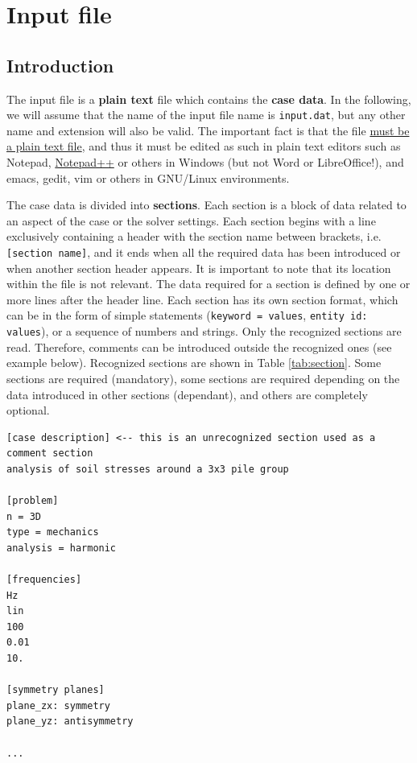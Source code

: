 \documentclass[a4paper,fleqn]{book}
\begin{document}
\chapter{Input file}

\label{ch:input_file}

\section{Introduction}

The input file is a \textbf{plain text} file which contains the \textbf{case data}. In the following, we will assume that the name of the input file name is \texttt{input.dat}, but any other name and extension will also be valid. The important fact is that the file \underline{must be a plain text file}, and thus it must be edited as such in plain text editors such as Notepad, \href{https://notepad-plus-plus.org/}{Notepad++} or others in Windows (but not Word or LibreOffice!), and emacs, gedit, vim or others in GNU/Linux environments.

The case data is divided into \textbf{sections}. Each section is a block of data related to an aspect of the case or the solver settings. Each section begins with a line exclusively containing a header with the section name between brackets, i.e. \texttt{[section name]}, and it ends when all the required data has been introduced or when another section header appears. It is important to note that its location within the file is not relevant. The data required for a section is defined by one or more lines after the header line. Each section has its own section format, which can be in the form of simple statements (\texttt{keyword = values}, \texttt{entity id: values}), or a sequence of numbers and strings. Only the recognized sections are read. Therefore, comments can be introduced outside the recognized ones (see example below). Recognized sections are shown in Table \ref{tab:section}. Some sections are required (mandatory), some sections are required depending on the data introduced in other sections (dependant), and others are completely optional.

\begin{Verbatim}[frame=single, fontsize=\small, label=input.dat]
[case description] <-- this is an unrecognized section used as a comment section
analysis of soil stresses around a 3x3 pile group 

[problem]
n = 3D
type = mechanics
analysis = harmonic

[frequencies]
Hz
lin
100
0.01
10.

[symmetry planes]
plane_zx: symmetry
plane_yz: antisymmetry

...
\end{Verbatim}
\end{document}
